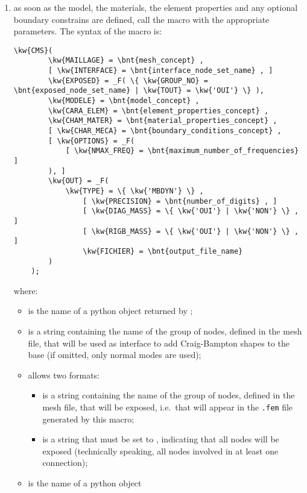 \begin{enumerate}
\item as soon as the model, the materials, the element properties
and any optional boundary constrains are defined,
call the  macro with the appropriate parameters.
The syntax of the macro is:
\begin{Verbatim}[commandchars=\\\{\}]
    \kw{CMS}(
        \kw{MAILLAGE} = \bnt{mesh_concept} ,
        [ \kw{INTERFACE} = \bnt{interface_node_set_name} , ]
        \kw{EXPOSED} = _F( \{ \kw{GROUP_NO} = \bnt{exposed_node_set_name} | \kw{TOUT} = \kw{'OUI'} \} ),
        \kw{MODELE} = \bnt{model_concept} ,
        \kw{CARA_ELEM} = \bnt{element_properties_concept} ,
        \kw{CHAM_MATER} = \bnt{material_properties_concept} ,
        [ \kw{CHAR_MECA} = \bnt{boundary_conditions_concept} ,
        [ \kw{OPTIONS} = _F(
            [ \kw{NMAX_FREQ} = \bnt{maximum_number_of_frequencies} ]
        ), ]
        \kw{OUT} = _F(
            \kw{TYPE} = \{ \kw{'MBDYN'} \} ,
                [ \kw{PRECISION} = \bnt{number_of_digits} , ]
                [ \kw{DIAG_MASS} = \{ \kw{'OUI'} | \kw{'NON'} \} , ]
                [ \kw{RIGB_MASS} = \{ \kw{'OUI'} | \kw{'NON'} \} , ]
                \kw{FICHIER} = \bnt{output_file_name}
        )
    );
\end{Verbatim}
where:
\begin{itemize}
\item {} is the name of a python object
	returned by ;
\item {} is a string containing the name of the group of nodes,
	defined in the mesh file, that will be used as interface
	to add Craig-Bampton shapes to the base
	(if omitted, only normal modes are used);
\item {} allows two formats:
	\begin{itemize}
	\item {} is a string containing the name
		of the group of nodes, defined in the mesh file,
		that will be exposed, i.e.\ that will appear
		in the \texttt{.fem} file generated by this macro;
	\item {} is a string that must be set to ,
		indicating that all nodes will be exposed
		(technically speaking, all nodes involved
		in at least one connection);
	\end{itemize}
\item {} is the name of a python object

\end{itemize}
\end{enumerate}
